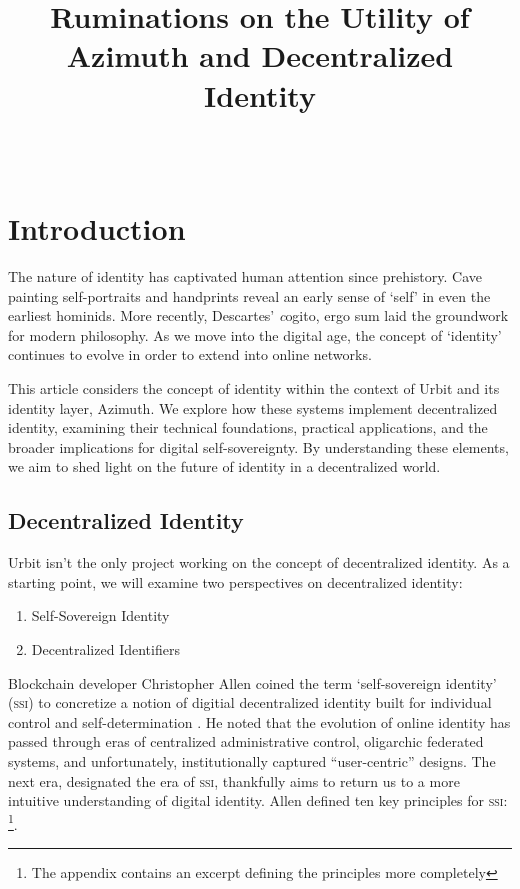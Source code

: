 \documentclass[twoside]{article}
\title{Ruminations on the Utility of Azimuth and Decentralized Identity}
\author{\authorname~\authorpatp \\ \affiliation}
\date{}
\begin{document}
\maketitle
\thispagestyle{firststyle}

\begin{abstract}
\end{abstract}

\setcounter{page}{1}

\tableofcontents

\section{Introduction}

The nature of identity has captivated human attention since prehistory. Cave painting self-portraits and handprints reveal an early sense of `self' in even the earliest hominids. More recently, Descartes' {\emph cogito, ergo sum} laid the groundwork for modern philosophy. As we move into the digital age, the concept of `identity' continues to evolve in order to extend into online networks.

This article considers the concept of identity within the context of Urbit and its identity layer, Azimuth. We explore how these systems implement decentralized identity, examining their technical foundations, practical applications, and the broader implications for digital self-sovereignty. By understanding these elements, we aim to shed light on the future of identity in a decentralized world.

\subsection{Decentralized Identity}

Urbit isn't the only project working on the concept of decentralized identity. As a starting point, we will examine two perspectives on decentralized identity:

\begin{enumerate}
  \item Self-Sovereign Identity
  \item Decentralized Identifiers
\end{enumerate}

Blockchain developer Christopher Allen coined the term `self-sovereign identity' (\textsc{ssi}) to concretize a notion of digitial decentralized identity built for individual control and self-determination \citep{Allen2016}. He noted that the evolution of online identity has passed through eras of centralized administrative control, oligarchic federated systems, and unfortunately, institutionally captured ``user-centric'' designs. The next era, designated the era of \textsc{ssi}, thankfully aims to return us to a more intuitive understanding of digital identity. Allen defined ten key principles for \textsc{ssi}: \footnote{The appendix contains an excerpt defining the principles more completely}.
\end{document}
